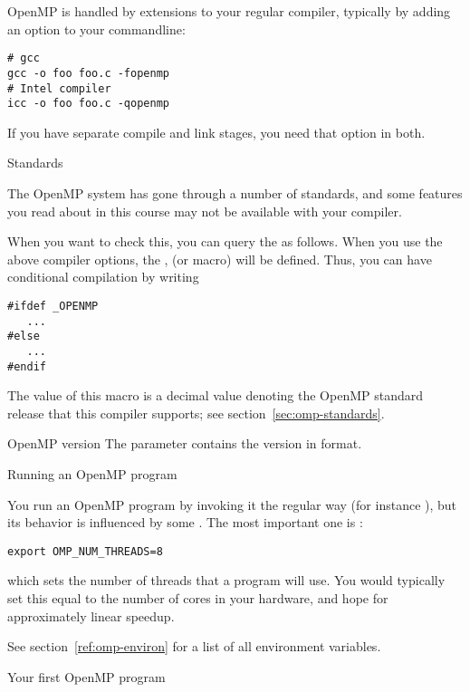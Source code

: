 OpenMP is handled by extensions to your regular compiler, typically by
adding an option to your commandline:
\begin{verbatim}
# gcc
gcc -o foo foo.c -fopenmp
# Intel compiler
icc -o foo foo.c -qopenmp
\end{verbatim}
If you have separate compile and link stages, you need that option in both.

 {Standards}

The OpenMP system has gone through a number of standards,
and some features you read about in this course
may not be available with your compiler.

When you want to check this, you can query the
 as follows.
When you use the above compiler options, 
the ,
(or   macro)
will be defined. Thus, you can have conditional compilation by writing
\begin{lstlisting}
#ifdef _OPENMP
   ...
#else
   ...
#endif
\end{lstlisting}
The value of this macro is a decimal value  denoting the OpenMP standard release
that this compiler supports;
see section~\ref{sec:omp-standards}.

\begin{fortrannote}{OpenMP version}
  The parameter  contains the version in  format.
\end{fortrannote}


 {Running an OpenMP program}

You run an OpenMP program by invoking it the regular way (for instance ),
but its behavior is influenced by some .
The most important one is :
\begin{verbatim}
export OMP_NUM_THREADS=8
\end{verbatim}
which sets the number of threads that a program will use.
You would typically set this equal to the number of cores
in your hardware, and hope for approximately linear speedup.

See section~\ref{ref:omp-environ} for a list of all environment variables.


 {Your first OpenMP program}

